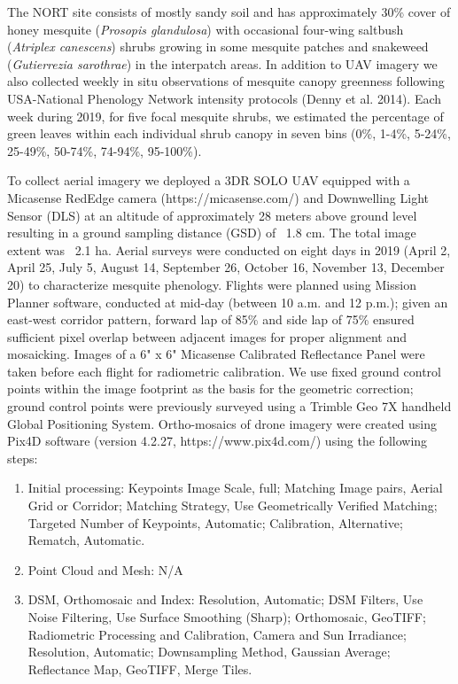 \documentclass{article}
\begin{document}
The NORT site consists of mostly sandy soil and has approximately 30\% cover of honey mesquite (\textit{Prosopis glandulosa}) with occasional four-wing saltbush (\textit{Atriplex canescens}) shrubs growing in some mesquite patches and snakeweed (\textit{Gutierrezia sarothrae}) in the interpatch areas. In addition to UAV imagery we also collected weekly in situ observations of mesquite canopy greenness following USA-National Phenology Network intensity protocols (Denny et al. 2014). Each week during 2019, for five focal mesquite shrubs, we estimated the percentage of green leaves within each individual shrub canopy in seven bins (0\%, 1-4\%, 5-24\%, 25-49\%, 50-74\%, 74-94\%, 95-100\%).

To collect aerial imagery we deployed a 3DR SOLO UAV equipped with a Micasense RedEdge camera (https://micasense.com/) and Downwelling Light Sensor (DLS) at an altitude of approximately 28 meters above ground level resulting in a ground sampling distance (GSD) of ~1.8 cm. The total image extent was ~2.1 ha.
Aerial surveys were conducted on eight days in 2019 (April 2, April 25, July 5, August 14, September 26, October 16, November 13, December 20) to characterize mesquite phenology. Flights were planned using Mission Planner software, conducted at mid-day (between 10 a.m. and 12 p.m.); given an east-west corridor pattern, forward lap of 85\% and side lap of 75\% ensured sufficient pixel overlap between adjacent images for proper alignment and mosaicking.
Images of a 6" x 6" Micasense Calibrated Reflectance Panel were taken before each flight for radiometric calibration. We use fixed ground control points within the image footprint as the basis for the geometric correction; ground control points were previously surveyed using a Trimble Geo 7X handheld Global Positioning System. 
Ortho-mosaics of drone imagery were created using Pix4D software (version 4.2.27, https://www.pix4d.com/) using the following steps:
\begin{enumerate}
    \item Initial processing: Keypoints Image Scale, full; Matching Image pairs, Aerial Grid or Corridor; Matching Strategy, Use Geometrically Verified Matching; Targeted Number of Keypoints, Automatic; Calibration, Alternative; Rematch, Automatic.
    \item Point Cloud and Mesh: N/A
    \item DSM, Orthomosaic and Index: Resolution, Automatic; DSM Filters, Use Noise Filtering, Use Surface Smoothing (Sharp); Orthomosaic, GeoTIFF; Radiometric Processing and Calibration, Camera and Sun Irradiance; Resolution, Automatic; Downsampling Method, Gaussian Average; Reflectance Map, GeoTIFF, Merge Tiles.
\end{enumerate}
\end{document}
